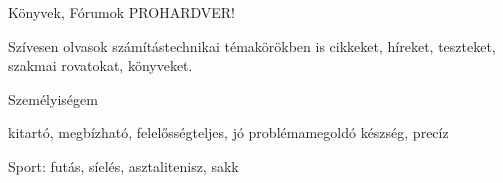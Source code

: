 

\begin{cventries}

  \cventry
    {Könyvek, Fórumok} %
    {} %
    {PROHARDVER!} %
    {} %
    {
      \begin{cvitems} %
        \item {Szívesen olvasok számítástechnikai témakörökben is cikkeket, híreket, teszteket, szakmai rovatokat, könyveket.}
      \end{cvitems}
    }

  \cventry
    {Személyiségem} %
    {} %
    {} %
    {} %
    {
      \begin{cvitems} %
        \item {kitartó, megbízható, felelősségteljes, jó problémamegoldó készség, precíz}
        \item {Sport: futás, síelés, asztalitenisz, sakk}
      \end{cvitems}
    }

\end{cventries}
